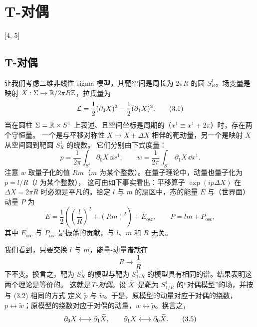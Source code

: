 \section{T-对偶}

[4, 5]

\subsection{T-对偶}

让我们考虑二维非线性 sigma 模型，其靶空间是周长为 $2\pi R$ 的圆 $S^1_R$。场变量是映射
$X:\Sigma\to\mathbb{R}/2\pi R\mathbb{Z}$，拉氏量为
\begin{equation}
  \mathcal{L}=\frac{1}{2}(\partial_0X)^2-\frac{1}{2}(\partial_1X)^2. \tag{3.1}
\end{equation}
当在圆柱 $\Sigma=\mathbb{R}\times S^1$ 上表述、且空间坐标是周期的（$x^1\equiv x^1+2\pi$）时，存在两个守恒量。
一个是与平移对称性 $X\to X+\Delta X$ 相伴的靶动量，另一个是映射 $X$ 从空间圆到靶圆 $S^1_R$ 的绕数。
它们分别由下式度量：
\begin{equation}
  p=\frac{1}{2\pi}\int_{S^1}\partial_0X\,\dd x^1,\qquad
  w=\frac{1}{2\pi}\int_{S^1}\partial_1X\,\dd x^1. \tag{3.2}
\end{equation}
注意 $w$ 取量子化的值 $Rm$（$m$ 为某个整数）。在量子理论中，动量也量子化为 $p=l/R$（$l$ 为某个整数），
这可由如下事实看出：平移算子 $\exp(ip\Delta X)$ 在 $\Delta X=2\pi R$ 时必须是平凡的。给定 $l$ 与 $m$
的扇区中，态的能量 $E$ 与（世界面）动量 $P$ 为
\begin{equation}
  E=\frac{1}{2}\left(\left(\frac{l}{R}\right)^2+(Rm)^2\right)+E_{\mathrm{osc}},\qquad
  P=lm+P_{\mathrm{osc}}, \tag{3.3}
\end{equation}
其中 $E_{\mathrm{osc}}$ 与 $P_{\mathrm{osc}}$ 是振荡的贡献，与 $l$、$m$ 和 $R$ 无关。

我们看到，只要交换 $l$ 与 $m$，能量-动量谱就在
\begin{equation}
  R\longrightarrow\frac{1}{R} \tag{3.4}
\end{equation}
下不变。换言之，靶为 $S^1_R$ 的模型与靶为 $S^1_{1/R}$ 的模型具有相同的谱。结果表明这两个理论是等价的。
这就是\emph{T-对偶}。设 $\widetilde{X}$ 是靶为 $S^1_{1/R}$ 的“对偶模型”的场，并按与 (3.2) 相同的方式
定义 $\tilde p$ 与 $\tilde w$。于是，原模型的动量对应于对偶的绕数，
$p\leftrightarrow\tilde w$；原模型的绕数对应于对偶的动量，$w\leftrightarrow\tilde p$。换言之，
\begin{equation}
  \partial_0X\longleftrightarrow\partial_1\widetilde{X},\qquad
  \partial_1X\longleftrightarrow\partial_0\widetilde{X}. \tag{3.5}
\end{equation}

